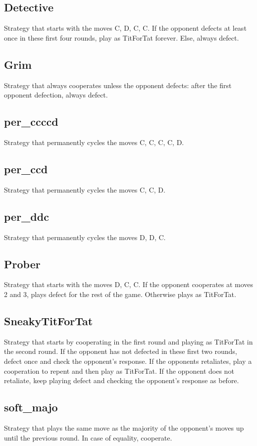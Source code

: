 \subsection{Detective}
Strategy that starts with the moves C, D, C, C. If the opponent defects at least once in these first four rounds, play as TitForTat forever. Else, always defect.

\subsection{Grim}
Strategy that always cooperates unless the opponent defects: after the first opponent defection, always defect.

\subsection{per\_ccccd}
Strategy that permanently cycles the moves C, C, C, C, D.

\subsection{per\_ccd}
Strategy that permanently cycles the moves C, C, D.

\subsection{per\_ddc}
Strategy that permanently cycles the moves D, D, C.

\subsection{Prober}
Strategy that starts with the moves D, C, C. If the opponent cooperates at moves 2 and 3, plays defect for the rest of the game. Otherwise plays as TitForTat.

\subsection{SneakyTitForTat}
Strategy that starts by cooperating in the first round and playing as TitForTat in the second round. If the opponent has not defected in these first two rounds, defect once and check the opponent's response. If the opponents retaliates, play a cooperation to repent and then play as TitForTat. If the opponent does not retaliate, keep playing defect and checking the opponent's response as before.

\subsection{soft\_majo}
Strategy that plays the same move as the majority of the opponent's moves up until the previous round. In case of equality, cooperate.

